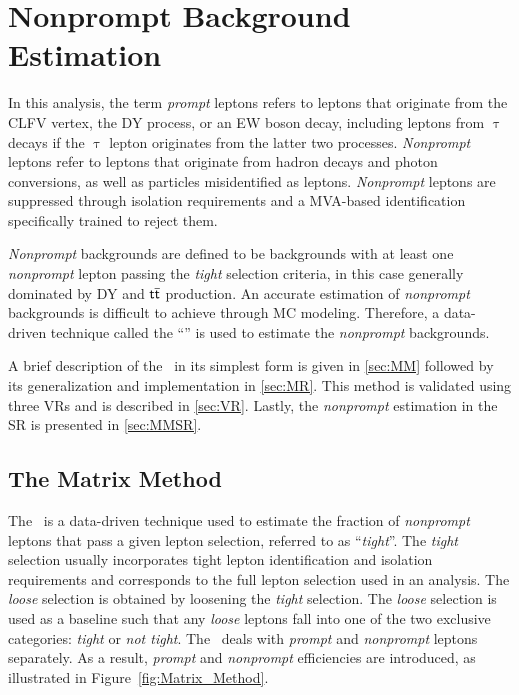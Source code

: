 \chapter{Nonprompt Background Estimation}
\label{chap:Nonprompt}

In this analysis, the term \emph{prompt} leptons refers to leptons that originate from the \ac{CLFV} vertex, the \ac{DY} process, or an \ac{EW} boson decay, including leptons from $\uptau$ decays if the $\uptau$ lepton originates from the latter two processes. \emph{Nonprompt} leptons refer to leptons that originate from hadron decays and photon conversions, as well as particles misidentified as leptons. \emph{Nonprompt} leptons are suppressed through isolation requirements and a \ac{MVA}-based identification specifically trained to reject them.

\emph{Nonprompt} backgrounds are defined to be backgrounds with at least one \emph{nonprompt} lepton passing the \emph{tight} selection criteria, in this case generally dominated by \ac{DY} and $\textsf{t}\overline{\textsf{t}}$ production. An accurate estimation of \emph{nonprompt} backgrounds is difficult to achieve through \ac{MC} modeling. Therefore, a data-driven technique called the ``\mm'' \cite{Gillam:2014xua} is used to estimate the \emph{nonprompt} backgrounds. 

A brief description of the \mm~in its simplest form is given in \autoref{sec:MM} followed by its generalization and implementation in \autoref{sec:MR}. This method is validated using three \acp{VR} and is described in \autoref{sec:VR}. Lastly, the \emph{nonprompt} estimation in the \ac{SR} is presented in \autoref{sec:MMSR}.

\section{The Matrix Method}
\label{sec:MM}

The \mm~is a data-driven technique used to estimate the fraction of \emph{nonprompt} leptons that pass a given lepton selection, referred to as ``\emph{tight}''. The \emph{tight} selection usually incorporates tight lepton identification and isolation requirements and corresponds to the full lepton selection used in an analysis. The \emph{loose} selection is obtained by loosening the \emph{tight} selection. The \emph{loose} selection is used as a baseline such that any \emph{loose} leptons fall into one of the two exclusive categories: \emph{tight} or \emph{not tight}. The \mm~deals with \emph{prompt} and \emph{nonprompt} leptons separately. As a result, \emph{prompt} and \emph{nonprompt} efficiencies are introduced, as illustrated in Figure~\ref{fig:Matrix_Method}.

